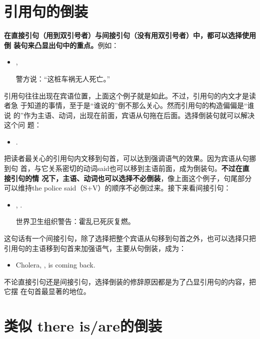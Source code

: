\section{引用句的倒装}

\textbf{在直接引句（用到双引号者）与间接引句（没有用双引号者）中，都可以选择使用倒
  装句来凸显出句中的重点。}例如：
\begin{itemize}
\item {} , 

  警方说：“这桩车祸无人死亡。”
\end{itemize}
引用句往往出现在宾语位置，上面这个例子就是如此。不过，引用句的内文才是读者急
于知道的事情，至于是“谁说的”倒不那么关心。然而引用句的构造偏偏是“谁说
的”作为主语、动词，出现在前面，宾语从句拖在后面。选择倒装句就可以解决这个问
题：
\begin{itemize}
\item {}  .
\end{itemize}
把读者最关心的引用句内文移到句首，可以达到强调语气的效果。因为宾语从句挪到句
首，与它关系密切的动词said也可以移到主语前面，成为倒装句。\textbf{不过在直接引句的情
况下，主语、动词也可以选择不必倒装}，像上面这个例子，句尾部分可以维持the
police said（S+V）的顺序不必倒过来。接下来看间接引句：
\begin{itemize}
\item {} , .

  世界卫生组织警告：霍乱已死灰复燃。
\end{itemize}
这句话有一个间接引句，除了选择把整个宾语从句移到句首之外，也可以选择只把引用句的主语移到句首来加强语气，主要从句倒装，成为：
\begin{itemize}
\item Cholera,  , is coming back.
\end{itemize}

不论直接引句还是间接引句，选择倒装的修辞原因都是为了凸显引用句的内容，把它摆
在句首最显著的地位。

\section{类似 there is/are的倒装}

